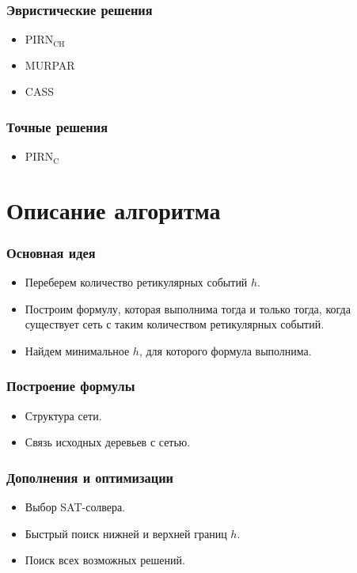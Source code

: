 \documentclass[hyperref={unicode}]{beamer}
\begin{document}
\begin{frame}
\frametitle{Эвристические решения}

\begin{itemize}
	\item $\mathrm{PIRN_{CH}}$
	\item MURPAR
	\item CASS
\end{itemize}

\end{frame}

\begin{frame}
\frametitle{Точные решения}

\begin{itemize}
	\item $\mathrm{PIRN_C}$
\end{itemize}

\end{frame}

\section{Описание алгоритма}

\begin{frame}
\frametitle{Основная идея}

\begin{itemize}
	\item Переберем количество ретикулярных событий $h$.
	\item Построим формулу, которая выполнима тогда и только тогда, когда существует сеть с таким количеством ретикулярных событий.
	\item Найдем минимальное $h$, для которого формула выполнима.
\end{itemize}

\end{frame}


\begin{frame}
\frametitle{Построение формулы}

\begin{itemize}
	\item Структура сети.
	\item Связь исходных деревьев с сетью.
\end{itemize}

\end{frame}

\begin{frame}
\frametitle{Дополнения и оптимизации}

\begin{itemize}
	\item Выбор SAT-солвера.
	\item Быстрый поиск нижней и верхней границ $h$.
	\item Поиск всех возможных решений.
\end{itemize}

\end{frame}
\end{document}
